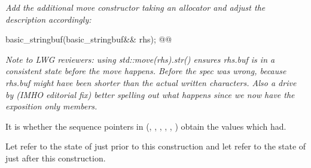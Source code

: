\documentclass[ebook,11pt,article]{memoir}
\begin{document}
\textit{Add the additional move constructor taking an allocator and adjust the description accordingly:}

\begin{itemdecl}
basic_stringbuf(basic_stringbuf&& rhs);
@@
\end{itemdecl}

\emph{Note to LWG reviewers: using std::move(rhs).str() ensures rhs.buf is in a consistent state before the move happens. Before the spec was wrong, because rhs.buf might have been shorter than the actual written characters. Also a drive by (IMHO editorial fix) better spelling out what happens since we now have the exposition only members.}

\begin{itemdescr}
\pnum
\effects {}
It is
 whether the sequence pointers in 
(, , ,
, , ) obtain
the values which  had. 

\pnum
\ensures Let  refer to the state of
 just prior to this construction and let 
refer to the state of  just after this construction.


\end{itemdescr}
\end{document}
